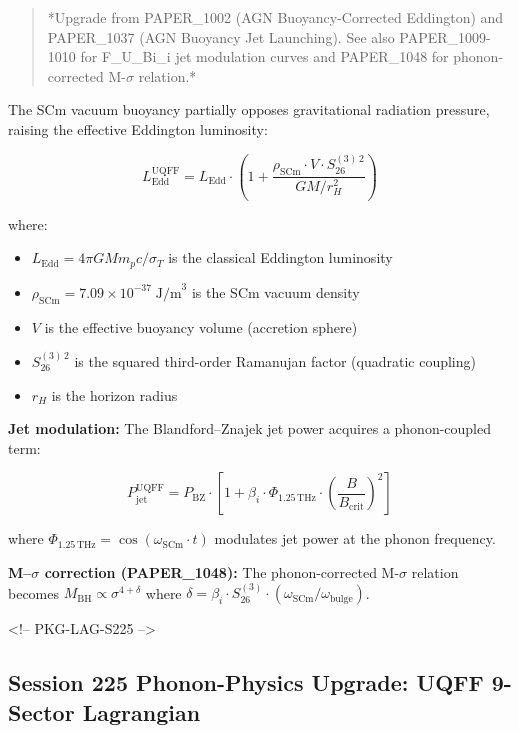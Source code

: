 \documentclass[12pt,a4paper]{article}
\begin{document}
\begin{quote}
*Upgrade from PAPER\_1002 (AGN Buoyancy-Corrected Eddington) and PAPER\_1037
(AGN Buoyancy Jet Launching).  See also PAPER\_1009-1010 for F\_{U\_Bi\_i} jet
modulation curves and PAPER\_1048 for phonon-corrected M-$\sigma$ relation.*
\end{quote}

The SCm vacuum buoyancy partially opposes gravitational radiation pressure, raising the effective Eddington luminosity:

\begin{equation}
L_{\text{Edd}}^{\text{UQFF}} = L_{\text{Edd}} \cdot \left(1 + \frac{\rho_{\text{SCm}} \cdot V \cdot S_{26}^{(3)\,2}}{G M / r_H^2}\right)
\end{equation}

where:

\begin{itemize}
  \item $L_{\text{Edd}} = 4\pi G M m_p c / \sigma_T$ is the classical Eddington luminosity
  \item $\rho_{\text{SCm}} = 7.09 \times 10^{-37}\;\text{J/m}^3$ is the SCm vacuum density
  \item $V$ is the effective buoyancy volume (accretion sphere)
  \item $S_{26}^{(3)\,2}$ is the squared third-order Ramanujan factor (quadratic coupling)
  \item $r_H$ is the horizon radius
\end{itemize}

\textbf{Jet modulation:} The Blandford--Znajek jet power acquires a phonon-coupled term:

\begin{equation}
P_{\text{jet}}^{\text{UQFF}} = P_{\text{BZ}} \cdot \left[1 + \beta_i \cdot \Phi_{1.25\,\text{THz}} \cdot \left(\frac{B}{B_{\text{crit}}}\right)^2\right]
\end{equation}

where $\Phi_{1.25\,\text{THz}} = \cos(\omega_{\text{SCm}} \cdot t)$ modulates jet power at the phonon frequency.

\textbf{M--$\sigma$ correction (PAPER\_1048):} The phonon-corrected M-$\sigma$ relation becomes $M_{\text{BH}} \propto \sigma^{4+\delta}$ where $\delta = \beta_i \cdot S_{26}^{(3)} \cdot (\omega_{\text{SCm}}/\omega_{\text{bulge}})$.

<!-- PKG-LAG-S225 -->

\subsection{Session 225 Phonon-Physics Upgrade: UQFF 9-Sector Lagrangian}
\end{document}
